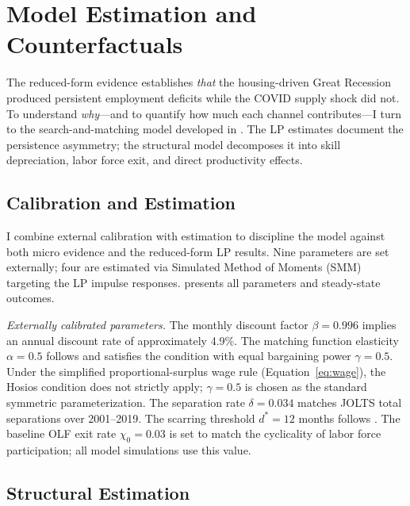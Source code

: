\documentclass[12pt]{article}
\begin{document}
\section{Model Estimation and Counterfactuals}
\label{sec:model_estimation}

The reduced-form evidence establishes \textit{that} the housing-driven Great Recession produced persistent employment deficits while the COVID supply shock did not. To understand \textit{why}---and to quantify how much each channel contributes---I turn to the search-and-matching model developed in . The LP estimates document the persistence asymmetry; the structural model decomposes it into skill depreciation, labor force exit, and direct productivity effects.

\subsection{Calibration and Estimation}

I combine external calibration with estimation to discipline the model against both micro evidence and the reduced-form LP results. Nine parameters are set externally; four are estimated via Simulated Method of Moments (SMM) targeting the LP impulse responses.  presents all parameters and steady-state outcomes.



\textit{Externally calibrated parameters.} The monthly discount factor $\beta = 0.996$ implies an annual discount rate of approximately 4.9\%. The matching function elasticity $\alpha = 0.5$ follows \citet{petrongolo2001looking} and satisfies the \citet{hosios1990welfare} condition with equal bargaining power $\gamma = 0.5$. Under the simplified proportional-surplus wage rule (Equation~\ref{eq:wage}), the Hosios condition does not strictly apply; $\gamma = 0.5$ is chosen as the standard symmetric parameterization. The separation rate $\delta = 0.034$ matches JOLTS total separations over 2001--2019. The scarring threshold $d^* = 12$ months follows \citet{kroft2016long}. The baseline OLF exit rate $\chi_0 = 0.03$ is set to match the cyclicality of labor force participation; all model simulations use this value.

\subsection{Structural Estimation}
\label{sec:structural_estimation}
\end{document}

